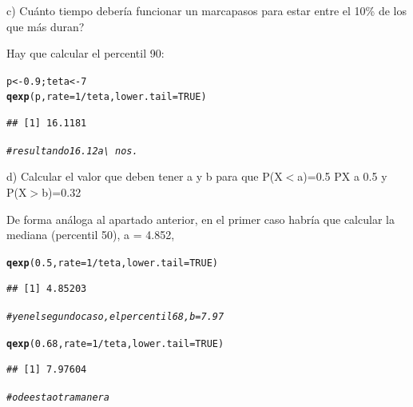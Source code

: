\documentclass[12pt,letterpaper]{article}\usepackage[]{graphicx}\usepackage[]{color}
\makeatletter
\newcommand{\hlnum}[1]{\textcolor[rgb]{0.686,0.059,0.569}{#1}}%
\newcommand{\hlcom}[1]{\textcolor[rgb]{0.678,0.584,0.686}{\textit{#1}}}%
\newcommand{\hlopt}[1]{\textcolor[rgb]{0,0,0}{#1}}%
\newcommand{\hlstd}[1]{\textcolor[rgb]{0.345,0.345,0.345}{#1}}%
\newcommand{\hlkwb}[1]{\textcolor[rgb]{0.69,0.353,0.396}{#1}}%
\newcommand{\hlkwc}[1]{\textcolor[rgb]{0.333,0.667,0.333}{#1}}%
\newcommand{\hlkwd}[1]{\textcolor[rgb]{0.737,0.353,0.396}{\textbf{#1}}}%
\newenvironment{kframe}{%
 \def\at@end@of@kframe{}%
 \ifinner\ifhmode%
  \def\at@end@of@kframe{\end{minipage}}%
  \begin{minipage}{\columnwidth}%
 \fi\fi%
 \def\FrameCommand##1{\hskip\@totalleftmargin \hskip-\fboxsep
 \colorbox{shadecolor}{##1}\hskip-\fboxsep
     \hskip-\linewidth \hskip-\@totalleftmargin \hskip\columnwidth}%
 \MakeFramed {\advance\hsize-\width
   \@totalleftmargin\z@ \linewidth\hsize
   \@setminipage}}%
 {\par\unskip\endMakeFramed%
 \at@end@of@kframe}
\newenvironment{knitrout}{}{} %
\makeatother
\begin{document}
\begin{description}
\item c) Cu\'anto tiempo deber\'ia funcionar un marcapasos para estar entre el 10\% de los que m\'as duran?

Hay que calcular el percentil 90:
\begin{knitrout}
\color{fgcolor}\begin{kframe}
\begin{alltt}
\hlstd{p} \hlkwb{<-} \hlnum{0.9}\hlstd{; teta} \hlkwb{<-} \hlnum{7}
\hlkwd{qexp}\hlstd{(p,} \hlkwc{rate}\hlstd{=}\hlnum{1}\hlopt{/}\hlstd{teta,} \hlkwc{lower.tail}\hlstd{=}\hlnum{TRUE}\hlstd{)}
\end{alltt}
\begin{verbatim}
## [1] 16.1181
\end{verbatim}
\begin{alltt}
\hlcom{#resultando 16.12 a\textbackslash{}~nos. }
\end{alltt}
\end{kframe}
\end{knitrout}

\item d) Calcular el valor que deben tener a y b para que P(X$<$a)=0.5 PX a 0.5 y P(X$>$b)=0.32

De forma an\'aloga al apartado anterior, en el primer caso habr\'ia que calcular la mediana (percentil 50), a = 4.852,
\begin{knitrout}
\color{fgcolor}\begin{kframe}
\begin{alltt}
\hlkwd{qexp}\hlstd{(}\hlnum{0.5}\hlstd{,} \hlkwc{rate}\hlstd{=}\hlnum{1}\hlopt{/}\hlstd{teta,} \hlkwc{lower.tail}\hlstd{=}\hlnum{TRUE}\hlstd{)}
\end{alltt}
\begin{verbatim}
## [1] 4.85203
\end{verbatim}
\end{kframe}
\end{knitrout}
\begin{knitrout}
\color{fgcolor}\begin{kframe}
\begin{alltt}
\hlcom{# y en el segundo caso, el percentil 68, b = 7.97}

\hlkwd{qexp}\hlstd{(}\hlnum{0.68}\hlstd{,} \hlkwc{rate}\hlstd{=}\hlnum{1}\hlopt{/}\hlstd{teta,} \hlkwc{lower.tail}\hlstd{=}\hlnum{TRUE}\hlstd{)}
\end{alltt}
\begin{verbatim}
## [1] 7.97604
\end{verbatim}
\end{kframe}
\end{knitrout}
\begin{knitrout}
\color{fgcolor}\begin{kframe}
\begin{alltt}
\hlcom{# o de esta otra manera}


\end{alltt}
\end{kframe}
\end{knitrout}
\end{description}
\end{document}
